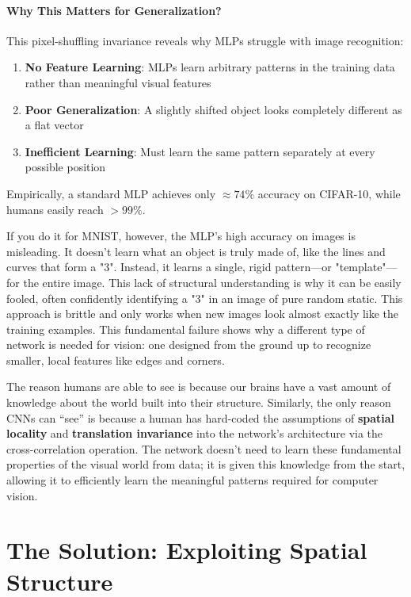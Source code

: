 \documentclass{article}
\begin{document}
\paragraph{Why This Matters for Generalization?}

This pixel-shuffling invariance reveals why MLPs struggle with image recognition:

\begin{enumerate}
    \item \textbf{No Feature Learning}: MLPs learn arbitrary patterns in the training data rather than meaningful visual features
    \item \textbf{Poor Generalization}: A slightly shifted object looks completely different as a flat vector
    \item \textbf{Inefficient Learning}: Must learn the same pattern separately at every possible position
\end{enumerate}

Empirically, a standard MLP achieves only $\approx 74\%$ accuracy on CIFAR-10, while humans easily reach $>99\%$.





If you do it for MNIST, however, the MLP's high accuracy on images is misleading. It doesn't learn what an object is truly made of, like the lines and curves that form a "3". Instead, it learns a single, rigid pattern—or "template"—for the entire image. This lack of structural understanding is why it can be easily fooled, often confidently identifying a "3" in an image of pure random static. This approach is brittle and only works when new images look almost exactly like the training examples. This fundamental failure shows why a different type of network is needed for vision: one designed from the ground up to recognize smaller, local features like edges and corners.


The reason humans are able to see is because our brains have a vast amount of knowledge about the world built into their structure. Similarly, the only reason CNNs can ``see'' is because a human has hard-coded the assumptions of \textbf{spatial locality} and \textbf{translation invariance} into the network's architecture via the cross-correlation operation. The network doesn't need to learn these fundamental properties of the visual world from data; it is given this knowledge from the start, allowing it to efficiently learn the meaningful patterns required for computer vision.


\section{The Solution: Exploiting Spatial Structure}
\end{document}
